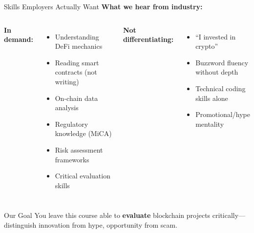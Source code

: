 \documentclass[10pt]{beamer}
\newcommand{\highlight}[1]{\textcolor{AccentOrange}{\textbf{#1}}}
\newcommand{\good}[1]{\textcolor{AccentGreen}{#1}}
\newcommand{\bad}[1]{\textcolor{AccentOrange}{#1}}
\begin{document}
\begin{frame}{Skills Employers Actually Want}
  \textbf{What we hear from industry:}
  
  \vspace{0.5em}
  \begin{columns}[T]
    \textbf{\good{In demand:}}
    \begin{itemize}
      \item Understanding DeFi mechanics
      \item Reading smart contracts (not writing)
      \item On-chain data analysis
      \item Regulatory knowledge (MiCA)
      \item Risk assessment frameworks
      \item Critical evaluation skills
    \end{itemize}
    
    \textbf{\bad{Not differentiating:}}
    \begin{itemize}
      \item ``I invested in crypto''
      \item Buzzword fluency without depth
      \item Technical coding skills alone
      \item Promotional/hype mentality
    \end{itemize}
  \end{columns}
  
  \vspace{1em}
  \begin{block}{Our Goal}
    You leave this course able to \highlight{evaluate} blockchain projects critically---distinguish innovation from hype, opportunity from scam.
  \end{block}
\end{frame}
\end{document}

